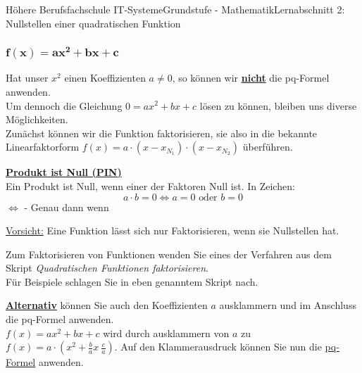 \documentclass[11pt,twocolumn,oneside,openany,headings=optiontotoc,11pt,numbers=noenddot]{article}
\begin{document}
\begin{worksheet}{Höhere Berufsfachschule IT-Systeme}{Grundstufe - Mathematik}{Lernabschnitt 2: Nullstellen einer quadratischen Funktion}
		\subsubsection*{\(\mathbf{f(x) = ax^2 + bx + c}\)}
		Hat unser \(x^2\) einen Koeffizienten \(a \neq{} 0\), so können wir \underline{\textbf{nicht}} die pq-Formel anwenden.\\
		Um dennoch die Gleichung \(0 = ax^2 +bx + c\) lösen zu können, bleiben uns diverse Möglichkeiten.\\
		Zunächst können wir die Funktion faktorisieren, sie also in die bekannte Linearfaktorform \(f(x) = a\cdot{}(x-x_{N_1})\cdot(x-x_{N_2})\) überführen.
		\begin{framed}
			\noindent
			\underline{\textbf{Produkt ist Null (PIN)}}\\
			Ein Produkt ist Null, wenn einer der Faktoren Null ist. In Zeichen: \[a\cdot{}b = 0 \Leftrightarrow a = 0 \text{\ oder\ } b = 0\]
			\small{\(\Leftrightarrow\) - Genau dann wenn}\normalsize
		\end{framed}
		\begin{framed}
			\noindent
			\underline{Vorsicht:} Eine Funktion lässt sich nur Faktorisieren, wenn sie Nullstellen hat.
		\end{framed}
		\noindent
		Zum Faktorisieren von Funktionen wenden Sie eines der Verfahren aus dem Skript \textit{Quadratischen Funktionen faktorisieren}.\\
		\small{Für Beispiele schlagen Sie in eben genanntem Skript nach.}\normalsize\\
		\par\noindent
		\underline{\textbf{Alternativ}} können Sie auch den Koeffizienten \(a\) ausklammern und im Anschluss die pq-Formel anwenden.\\
		\(f(x) = ax^2 + bx + c\) wird durch ausklammern von \(a\) zu \(f(x) = a\cdot{}(x^2 + \frac{b}{a}x~ \frac{c}{a})\). Auf den Klammerausdruck können Sie nun die \underline{pq-Formel} anwenden.

\end{worksheet}
\end{document}
